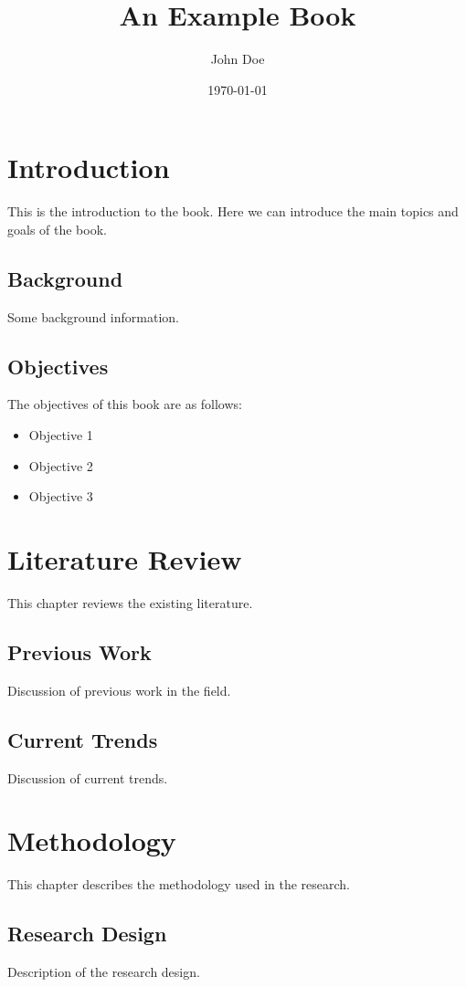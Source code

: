 \documentclass{book}
\title{An Example Book}
\author{John Doe}
\date{\today}
\begin{document}
\frontmatter
\maketitle
\tableofcontents
\listoffigures
\listoftables

\mainmatter

\chapter{Introduction}
This is the introduction to the book. Here we can introduce the main topics and goals of the book.

\section{Background}
Some background information.

\section{Objectives}
The objectives of this book are as follows:
\begin{itemize}
  \item Objective 1
  \item Objective 2
  \item Objective 3
\end{itemize}

\chapter{Literature Review}
This chapter reviews the existing literature.

\section{Previous Work}
Discussion of previous work in the field.

\section{Current Trends}
Discussion of current trends.

\chapter{Methodology}
This chapter describes the methodology used in the research.

\section{Research Design}
Description of the research design.
\end{document}
